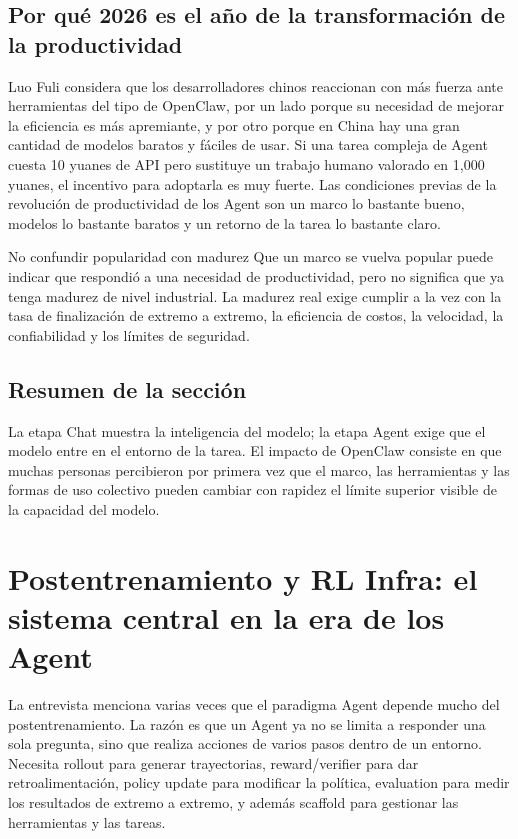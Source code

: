 \documentclass[a4paper]{article}
\begin{document}
\subsection{Por qué 2026 es el año de la transformación de la productividad}

Luo Fuli considera que los desarrolladores chinos reaccionan con más fuerza ante herramientas del tipo de OpenClaw, por un lado porque su necesidad de mejorar la eficiencia es más apremiante, y por otro porque en China hay una gran cantidad de modelos baratos y fáciles de usar. Si una tarea compleja de Agent cuesta 10 yuanes de API pero sustituye un trabajo humano valorado en 1,000 yuanes, el incentivo para adoptarla es muy fuerte. Las condiciones previas de la revolución de productividad de los Agent son un marco lo bastante bueno, modelos lo bastante baratos y un retorno de la tarea lo bastante claro.

\begin{warningbox}{No confundir popularidad con madurez}
Que un marco se vuelva popular puede indicar que respondió a una necesidad de productividad, pero no significa que ya tenga madurez de nivel industrial. La madurez real exige cumplir a la vez con la tasa de finalización de extremo a extremo, la eficiencia de costos, la velocidad, la confiabilidad y los límites de seguridad.
\end{warningbox}

\subsection{Resumen de la sección}

La etapa Chat muestra la inteligencia del modelo; la etapa Agent exige que el modelo entre en el entorno de la tarea. El impacto de OpenClaw consiste en que muchas personas percibieron por primera vez que el marco, las herramientas y las formas de uso colectivo pueden cambiar con rapidez el límite superior visible de la capacidad del modelo.
\section{Postentrenamiento y RL Infra: el sistema central en la era de los Agent}

La entrevista menciona varias veces que el paradigma Agent depende mucho del postentrenamiento. La razón es que un Agent ya no se limita a responder una sola pregunta, sino que realiza acciones de varios pasos dentro de un entorno. Necesita rollout para generar trayectorias, reward/verifier para dar retroalimentación, policy update para modificar la política, evaluation para medir los resultados de extremo a extremo, y además scaffold para gestionar las herramientas y las tareas.
\end{document}

